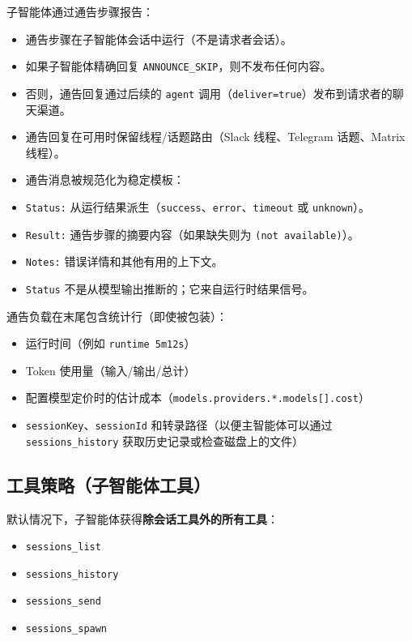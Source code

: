 子智能体通过通告步骤报告：

\begin{itemize}
  \item 通告步骤在子智能体会话中运行（不是请求者会话）。
  \item 如果子智能体精确回复 \texttt{ANNOUNCE\_SKIP}，则不发布任何内容。
  \item 否则，通告回复通过后续的 \texttt{agent} 调用（\texttt{deliver=true}）发布到请求者的聊天渠道。
  \item 通告回复在可用时保留线程/话题路由（Slack 线程、Telegram 话题、Matrix 线程）。
  \item 通告消息被规范化为稳定模板：
  \item \texttt{Status:} 从运行结果派生（\texttt{success}、\texttt{error}、\texttt{timeout} 或 \texttt{unknown}）。
  \item \texttt{Result:} 通告步骤的摘要内容（如果缺失则为 \texttt{(not available)}）。
  \item \texttt{Notes:} 错误详情和其他有用的上下文。
  \item \texttt{Status} 不是从模型输出推断的；它来自运行时结果信号。
\end{itemize}


通告负载在末尾包含统计行（即使被包装）：

\begin{itemize}
  \item 运行时间（例如 \texttt{runtime 5m12s}）
  \item Token 使用量（输入/输出/总计）
  \item 配置模型定价时的估计成本（\texttt{models.providers.*.models[].cost}）
  \item \texttt{sessionKey}、\texttt{sessionId} 和转录路径（以便主智能体可以通过 \texttt{sessions\_history} 获取历史记录或检查磁盘上的文件）
\end{itemize}


\subsection{工具策略（子智能体工具）}


默认情况下，子智能体获得\textbf{除会话工具外的所有工具}：

\begin{itemize}
  \item \texttt{sessions\_list}
  \item \texttt{sessions\_history}
  \item \texttt{sessions\_send}
  \item \texttt{sessions\_spawn}
\end{itemize}


